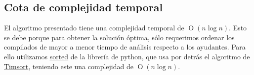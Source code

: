 \subsection{Cota de complejidad temporal}

El algoritmo presentado tiene una complejidad temporal de $\operatorname{O}(n \log{n})$.
Esto se debe porque para obtener la solución óptima, sólo requerimos ordenar los compilados
de mayor a menor tiempo de análisis respecto a los ayudantes. Para ello utilizamos
\href{https://docs.python.org/3/howto/sorting.html}{\color{cyan}\underline{sorted}} de la librería de python, que usa 
por detrás el algoritmo de
\href{https://en.wikipedia.org/wiki/Timsort}{\color{cyan}\underline{Timsort}}, teniendo este una complejidad de $\operatorname{O}(n \log{n})$.

